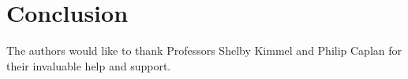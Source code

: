 \section{Conclusion}


\begin{acks}
The authors would like to thank Professors Shelby Kimmel
and Philip Caplan for their invaluable help and support. 
\end{acks}